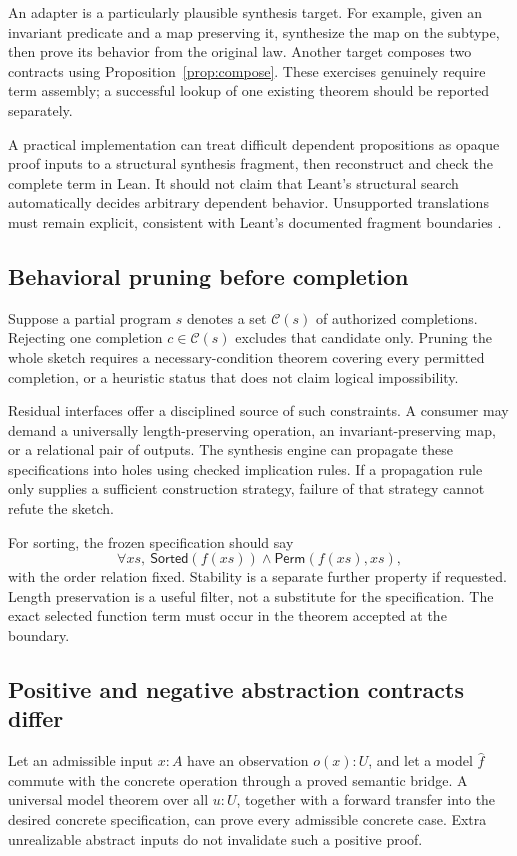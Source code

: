 \documentclass[11pt,a4paper]{article}
\numberwithin{equation}{section}
\theoremstyle{definition}\newtheorem{definition}[theorem]{Definition}
\theoremstyle{remark}\newtheorem{remark}[theorem]{Remark}
\begin{document}
An adapter is a particularly plausible synthesis target. For example, given
an invariant predicate and a map preserving it, synthesize the map on the
subtype, then prove its behavior from the original law. Another target composes
two contracts using Proposition~\ref{prop:compose}. These exercises genuinely
require term assembly; a successful lookup of one existing theorem should be
reported separately.

A practical implementation can treat difficult dependent propositions as
opaque proof inputs to a structural synthesis fragment, then reconstruct and
check the complete term in Lean. It should not claim that Leant's structural
search automatically decides arbitrary dependent behavior. Unsupported
translations must remain explicit, consistent with Leant's documented
fragment boundaries \cite{leantReadme}.

\subsection{Behavioral pruning before completion}
Suppose a partial program \(s\) denotes a set \(\mathcal C(s)\) of authorized
completions. Rejecting one completion \(c\in\mathcal C(s)\) excludes that
candidate only. Pruning the whole sketch requires a necessary-condition theorem
covering every permitted completion, or a heuristic status that does not claim
logical impossibility.

Residual interfaces offer a disciplined source of such constraints. A consumer
may demand a universally length-preserving operation, an invariant-preserving
map, or a relational pair of outputs. The synthesis engine can propagate these
specifications into holes using checked implication rules. If a propagation
rule only supplies a sufficient construction strategy, failure of that strategy
cannot refute the sketch.

For sorting, the frozen specification should say
\[
 \forall xs,\ \mathsf{Sorted}(f(xs))\land\mathsf{Perm}(f(xs),xs),
\]
with the order relation fixed. Stability is a separate further property if
requested. Length preservation is a useful filter, not a substitute for the
specification. The exact selected function term must occur in the theorem
accepted at the boundary.

\subsection{Positive and negative abstraction contracts differ}
Let an admissible input \(x:A\) have an observation \(o(x):U\), and let a
model \(\widehat f\) commute with the concrete operation through a proved
semantic bridge. A universal model theorem over all \(u:U\), together with a
forward transfer into the desired concrete specification, can prove every
admissible concrete case. Extra unrealizable abstract inputs do not invalidate
such a positive proof.
\end{document}
